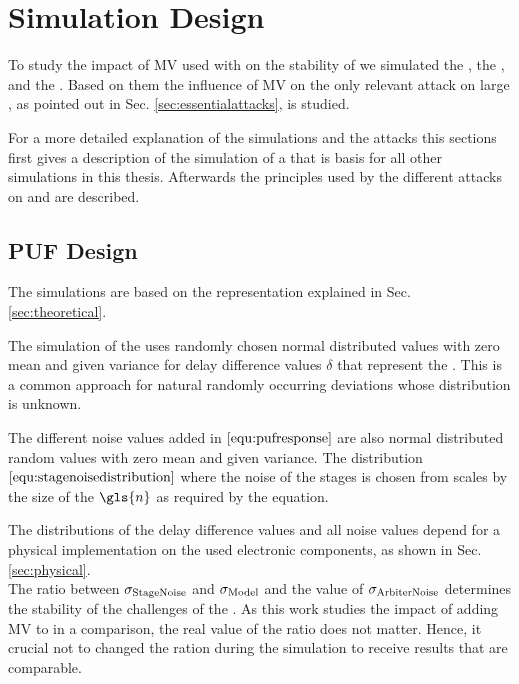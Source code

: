 \chapter{Simulation Design}
\label{cap:simulationdesign}

To study the impact of \ac{MV} used with \apufs on the stability of \apuf we simulated the \apuf, the \mpuf, and the \mxpuf.
Based on them the influence of \ac{MV} on the only relevant attack on large \xpufs, as pointed out in Sec. \ref{sec:essentialattacks}, is studied.


For a more detailed explanation of the simulations and the attacks this sections first gives a description of the simulation of a \apuf that is basis for all other \puf simulations in this thesis.
Afterwards the principles used by the different attacks on \mpufs and \mxpufs are described.



\section{\ac{PUF} Design}
\label{sec:pufsimulation}

The \apuf simulations are based on the \apuf representation explained in Sec. \ref{sec:theoretical}.

The simulation of the \apuf uses randomly chosen normal distributed values with zero mean and given variance for delay difference values $\delta$ that represent the \apuf.
This is a common approach for natural randomly occurring deviations whose distribution is unknown.%

The different noise values added in $\ref{equ:pufresponse}$ are also normal distributed random values with zero mean and given variance.
The distribution $\ref{equ:stagenoisedistribution}$ where the noise of the stages is chosen from scales by the size of the \apuf $\gls{n}$ as required by the equation.

The distributions of the delay difference values and all noise values depend for a physical \apuf implementation on the used electronic components, as shown in Sec. \ref{sec:physical}.\\
The ratio between $\sigma_{\mathrm{Stage Noise}}$ and $\sigma_{\mathrm{Model}}$ and the value of $\sigma_{\mathrm{Arbiter Noise}}$ determines the stability of the challenges of the \apuf.
As this work studies the impact of adding \ac{MV} to \apufs in a comparison, the real value of the ratio does not matter.
Hence, it crucial not to changed the ration during the simulation to receive results that are comparable.

